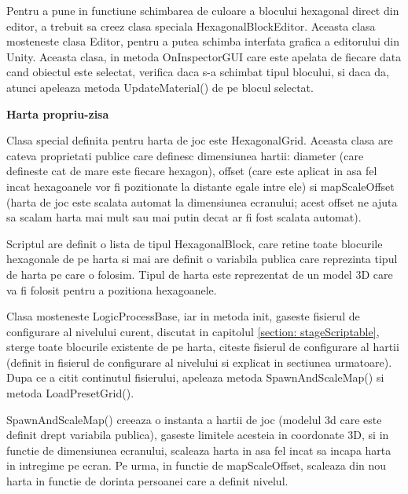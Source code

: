 \documentclass[12pt, a4paper]{article}
\begin{document}
	Pentru a pune in functiune schimbarea de culoare a blocului hexagonal direct din editor, a trebuit sa creez clasa speciala HexagonalBlockEditor. Aceasta clasa mosteneste clasa Editor, pentru a putea schimba interfata grafica a editorului din Unity. Aceasta clasa, in metoda OnInspectorGUI care este apelata de fiecare data cand obiectul este selectat, verifica daca s-a schimbat tipul blocului, si daca da, atunci apeleaza metoda UpdateMaterial() de pe blocul selectat.
	\newline
	
	
	
	
	
	\textbf{Harta propriu-zisa}
	
	Clasa special definita pentru harta de joc este HexagonalGrid. Aceasta clasa are cateva proprietati publice care definesc dimensiunea hartii: diameter (care defineste cat de mare este fiecare hexagon), offset (care este aplicat in asa fel incat hexagoanele vor fi pozitionate la distante egale intre ele) si mapScaleOffset (harta de joc este scalata automat la dimensiunea ecranului; acest offset ne ajuta sa scalam harta mai mult sau mai putin decat ar fi fost scalata automat).
	\newline
	
	Scriptul are definit o lista de tipul HexagonalBlock, care retine toate blocurile hexagonale de pe harta si mai are definit o variabila publica care reprezinta tipul de harta pe care o folosim. Tipul de harta este reprezentat de un model 3D care va fi folosit pentru a pozitiona hexagoanele.
	\newline
	
	Clasa mosteneste LogicProcessBase, iar in metoda init, gaseste fisierul de configurare al nivelului curent, discutat in capitolul \ref{section: stageScriptable}, sterge toate blocurile existente de pe harta, citeste fisierul de configurare al hartii (definit in fisierul de configurare al nivelului si explicat in sectiunea urmatoare). Dupa ce a citit continutul fisierului, apeleaza metoda SpawnAndScaleMap() si metoda LoadPresetGrid().
	\newline
	
	SpawnAndScaleMap() creeaza o instanta a hartii de joc (modelul 3d care este definit drept variabila publica), gaseste limitele acesteia in coordonate 3D, si in functie de dimensiunea ecranului, scaleaza harta in asa fel incat sa incapa harta in intregime pe ecran. Pe urma, in functie de mapScaleOffset, scaleaza din nou harta in functie de dorinta persoanei care a definit nivelul.
	\newline
	
\end{document}

